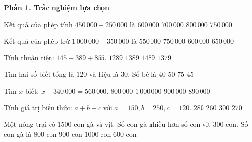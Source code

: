 \textbf{Phần 1. Trắc nghiệm lựa chọn}

\begin{ex} %
Kết quả của phép tính $450\,000 + 250\,000$ là
\choice
{$600\,000$}
{\True $700\,000$}
{$800\,000$}
{$750\,000$}
\end{ex}

\begin{ex} %
Kết quả của phép trừ $1\,000\,000 - 350\,000$ là
\choice
{$550\,000$}
{$750\,000$}
{$600\,000$}
{\True $650\,000$}
\end{ex}

\begin{ex} %
Tính thuận tiện: $145 + 389 + 855$.
\choice
{$1289$}
{\True $1389$}
{$1489$}
{$1379$}
\end{ex}

\begin{ex} %
Tìm hai số biết tổng là $120$ và hiệu là $30$. Số bé là
\choice
{$40$}
{$50$}
{$75$}
{\True $45$}
\end{ex}

\begin{ex} %
Tìm $x$ biết: $x - 340\,000 = 560\,000$.
\choice
{$800\,000$}
{$1\,000\,000$}
{\True $900\,000$}
{$890\,000$}
\end{ex}

\begin{ex} %
Tính giá trị biểu thức: $a + b - c$ với $a = 150, b = 250, c = 120$.
\choice
{\True $280$}
{$260$}
{$300$}
{$270$}
\end{ex}

\begin{ex} %
Một nông trại có $1500$ con gà và vịt. Số con gà nhiều hơn số con vịt $300$ con. Số con gà là
\choice
{$800$ con}
{\True $900$ con}
{$1000$ con}
{$600$ con}
\end{ex}

